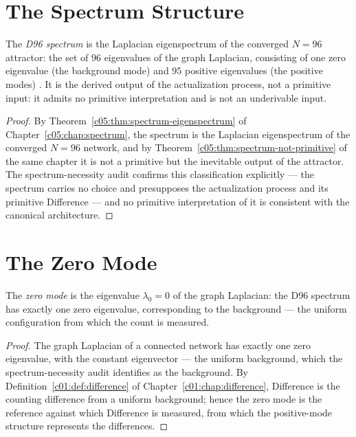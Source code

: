 \section{The Spectrum Structure}
\label{c06:sec:spectrum-structure}

\begin{theorem}
\label{c06:thm:d96-derived}
The \emph{D96 spectrum} is the Laplacian eigenspectrum of the converged $N=96$ attractor:
the set of $96$ eigenvalues of the graph Laplacian, consisting of one zero eigenvalue (the
background mode) and $95$ positive eigenvalues (the positive modes)
\cite{c06:QG155,c06:QG295}. It is the derived output of the actualization process, not a
primitive input: it admits no primitive interpretation and is not an underivable input.
\end{theorem}

\begin{proof}
By Theorem~\ref{c05:thm:spectrum-eigenspectrum} of Chapter~\ref{c05:chap:spectrum}, the spectrum is
the Laplacian eigenspectrum of the converged $N=96$ network, and by
Theorem~\ref{c05:thm:spectrum-not-primitive} of the same chapter it is not a primitive but the
inevitable output of the attractor. The spectrum-necessity audit \cite{c06:QG295} confirms
this classification explicitly --- the spectrum carries no choice and presupposes the
actualization process and its primitive Difference --- and no primitive interpretation of it
is consistent with the canonical architecture.
\end{proof}

\section{The Zero Mode}
\label{c06:sec:zero-mode}

\begin{theorem}
\label{c06:thm:zero-mode}
The \emph{zero mode} is the eigenvalue $\lambda_0 = 0$ of the graph Laplacian: the D96
spectrum has exactly one zero eigenvalue, corresponding to the background ---
the uniform configuration from which the count is measured.
\end{theorem}

\begin{proof}
The graph Laplacian of a connected network has exactly one zero eigenvalue, with the
constant eigenvector --- the uniform background, which the spectrum-necessity audit
\cite{c06:QG295} identifies as the background. By Definition~\ref{c01:def:difference} of
Chapter~\ref{c01:chap:difference}, Difference is the counting difference from a uniform
background; hence the zero mode is the reference against which Difference is measured, from
which the positive-mode structure represents the differences.
\end{proof}

